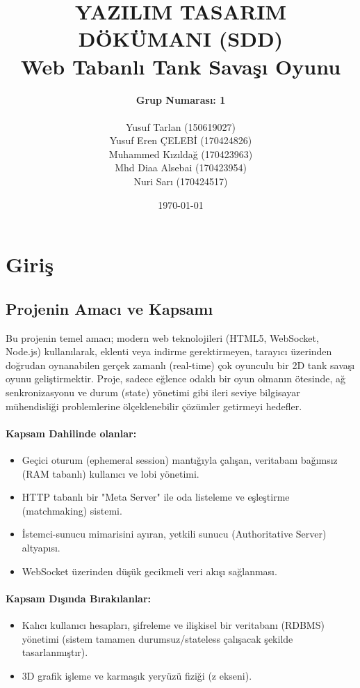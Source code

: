 \documentclass[12pt,a4paper]{article}
\title{
    \vspace{2in}
    \textbf{\Huge YAZILIM TASARIM DÖKÜMANI (SDD)} \\
    \vspace{0.5in}
    \textbf{\Large Web Tabanlı Tank Savaşı Oyunu} \\
    \vspace{1in}
}
\author{
    \textbf{Grup Numarası: 1} \\ \\
    Yusuf Tarlan (150619027) \\ 
    Yusuf Eren ÇELEBİ (170424826) \\ 
    Muhammed Kızıldağ (170423963) \\ 
    Mhd Diaa Alsebai (170423954) \\
    Nuri Sarı (170424517)
}
\date{\vfill \today}
\begin{document}
\maketitle
\thispagestyle{empty} %
\newpage

\tableofcontents
\newpage


\section{Giriş}
\subsection{Projenin Amacı ve Kapsamı}
Bu projenin temel amacı; modern web teknolojileri (HTML5, WebSocket, Node.js) kullanılarak,
eklenti veya indirme gerektirmeyen, tarayıcı üzerinden doğrudan oynanabilen gerçek zamanlı
(real-time) çok oyunculu bir 2D tank savaşı oyunu geliştirmektir. Proje, sadece eğlence
odaklı bir oyun olmanın ötesinde, ağ senkronizasyonu ve durum (state) yönetimi gibi ileri
seviye bilgisayar mühendisliği problemlerine ölçeklenebilir çözümler getirmeyi hedefler.
\paragraph{Kapsam Dahilinde olanlar:}
\begin{itemize}
      \item Geçici oturum (ephemeral session) mantığıyla çalışan,
            veritabanı bağımsız (RAM tabanlı) kullanıcı ve lobi yönetimi.
      \item HTTP tabanlı bir "Meta Server" ile oda listeleme
            ve eşleştirme (matchmaking) sistemi.
      \item İstemci-sunucu mimarisini ayıran, yetkili sunucu (Authoritative Server) altyapısı.
      \item WebSocket üzerinden düşük gecikmeli veri akışı sağlanması.
\end{itemize}

\paragraph{Kapsam Dışında Bırakılanlar:}

\begin{itemize}
      \item Kalıcı kullanıcı hesapları, şifreleme ve ilişkisel bir veritabanı (RDBMS)
            yönetimi (sistem tamamen durumsuz/stateless çalışacak şekilde tasarlanmıştır).
      \item 3D grafik işleme ve karmaşık yeryüzü fiziği (z ekseni).
\end{itemize}
\end{document}
